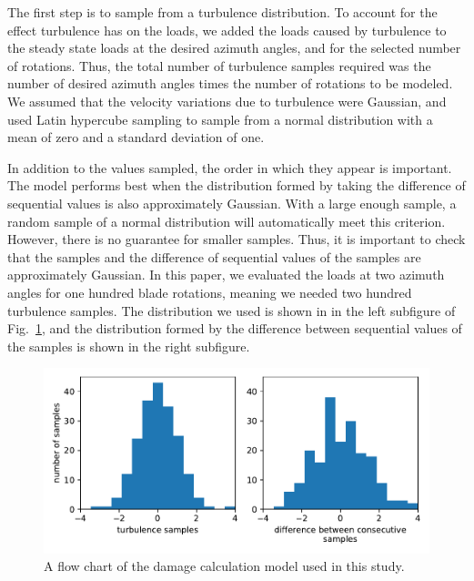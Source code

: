 \documentclass[11pt,letterpaper]{article}
\begin{document}
The first step is to sample from a turbulence distribution. 
To account for the effect turbulence has on the loads, we added the loads caused by turbulence to the steady state loads at the desired azimuth angles, and for the selected number of rotations. Thus, the total number of turbulence samples required was the number of desired azimuth angles times the number of rotations to be modeled. 
We assumed that the velocity variations due to turbulence were Gaussian, and used Latin hypercube sampling to sample from a normal distribution with a mean of zero and a standard deviation of one.  

In addition to the values sampled, the order in which they appear is important. The model performs best when the distribution formed by taking the difference of sequential values is also approximately Gaussian. With a large enough sample, a random sample of a normal distribution will automatically meet this criterion. However, there is no guarantee for smaller samples. Thus, it is important to check that the samples and the difference of sequential values of the samples are approximately Gaussian. In this paper, we evaluated the loads at two azimuth angles for one hundred blade rotations, meaning we needed two hundred turbulence samples. The distribution we used is shown in in the left subfigure of Fig.~\ref{samples}, and the distribution formed by the difference between sequential values of the samples is shown in the right subfigure.
% 
\begin{figure}
    \centering
    \includegraphics[]{images/turbulence_samples.pdf}
    \caption{A flow chart of the damage calculation model used in this study.}
    \label{samples}
\end{figure}
\end{document}
